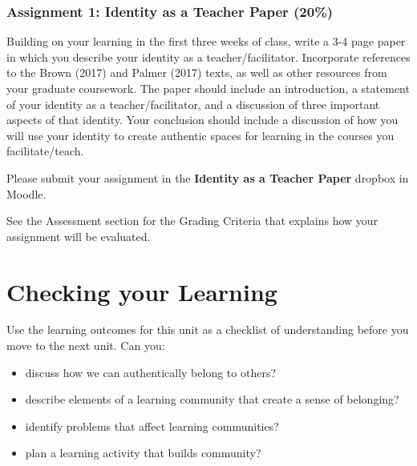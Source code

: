 \documentclass[
]{book}
\providecommand{\tightlist}{%
  \setlength{\itemsep}{0pt}\setlength{\parskip}{0pt}}
\begin{document}
\begin{assessment}
\hypertarget{assignment-1-identity-as-a-teacher-paper-20}{%
\subsubsection{Assignment 1: Identity as a Teacher Paper
(20\%)}\label{assignment-1-identity-as-a-teacher-paper-20}}

Building on your learning in the first three weeks of class, write a 3-4
page paper in which you describe your identity as a teacher/facilitator.
Incorporate references to the Brown (2017) and Palmer (2017) texts, as
well as other resources from your graduate coursework. The paper should
include an introduction, a statement of your identity as a
teacher/facilitator, and a discussion of three important aspects of that
identity. Your conclusion should include a discussion of how you will
use your identity to create authentic spaces for learning in the courses
you facilitate/teach.

Please submit your assignment in the \textbf{Identity as a Teacher
Paper} dropbox in Moodle.

See the Assessment section for the Grading Criteria that explains how
your assignment will be evaluated.
\end{assessment}

\hypertarget{checking-your-learning-2}{%
\section*{Checking your Learning}\label{checking-your-learning-2}}

\begin{progress}
Use the learning outcomes for this unit as a checklist of understanding
before you move to the next unit. Can you:

\begin{itemize}
\tightlist
\item
  discuss how we can authentically belong to others?
\item
  describe elements of a learning community that create a sense of
  belonging?
\item
  identify problems that affect learning communities?
\item
  plan a learning activity that builds community?
\end{itemize}
\end{progress}
\end{document}
